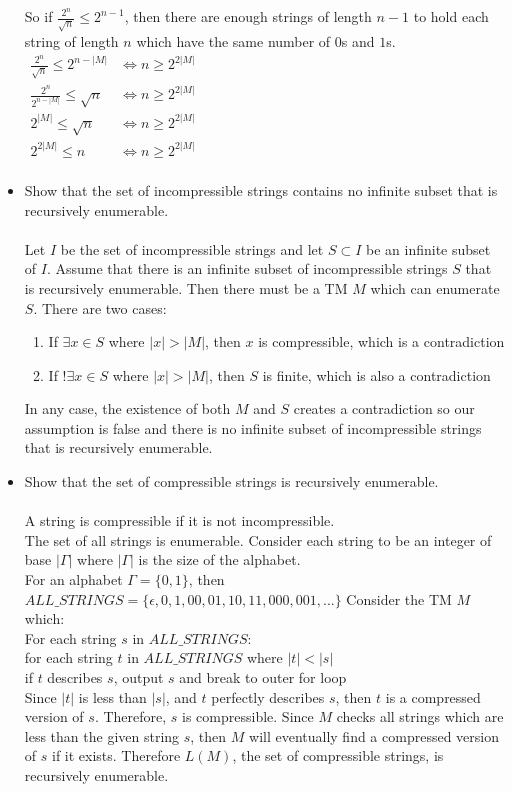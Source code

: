\documentclass[letterpaper,notitlepage,twoside]{article}
\renewcommand{\iff}{\Leftrightarrow} %
\newcommand\tab[1][1cm]{\hspace*{#1}} %
\begin{document}
\begin{itemize}
So if $\frac{2^n}{\sqrt{n}} \leq 2^{n - 1}$, then there are enough strings of length $n - 1$ to hold each string of length $n$ which have the same number of $0$s and $1$s.\\

$\begin{aligned}
\frac{2^n}{\sqrt{n}} \leq 2^{n - |M|} &\iff n \geq 2^{2|M|} \\
\frac{2^n}{2^{n - |M|}} \leq \sqrt{n} &\iff n \geq 2^{2|M|} \\
2^{|M|} \leq \sqrt{n} &\iff n \geq 2^{2|M|} \\
2^{2|M|} \leq n &\iff n \geq 2^{2|M|} \\
\end{aligned}$

\item Show that the set of incompressible strings contains no infinite subset that is recursively enumerable.\\\\
Let $I$ be the set of incompressible strings and let $S \subset I$ be an infinite subset of $I$. Assume that there is an infinite subset of incompressible strings $S$ that is recursively enumerable. Then there must be a TM $M$ which can enumerate $S$. There are two cases:
\begin{enumerate}
\item If $\exists x \in S$ where $|x| > |M|$, then $x$ is compressible, which is a contradiction
\item If $!\exists x \in S$ where $|x| > |M|$, then $S$ is finite, which is also a contradiction
\end{enumerate}
In any case, the existence of both $M$ and $S$ creates a contradiction so our assumption is false and there is no infinite subset of incompressible strings that is recursively enumerable.

\item Show that the set of compressible strings is recursively enumerable.\\\\
A string is compressible if it is not incompressible.\\
The set of all strings is enumerable. Consider each string to be an integer of base $|\Gamma|$ where $|\Gamma|$ is the size of the alphabet. \\
For an alphabet $\Gamma = \{0, 1\}$, then $ALL\_STRINGS = \{\epsilon, 0, 1, 00, 01, 10, 11, 000, 001,...\}$
Consider the TM $M$ which: \\
For each string $s$ in $ALL\_STRINGS$: \\
	\tab for each string $t$ in $ALL\_STRINGS$ where $|t| < |s|$ \\
		\tab\tab if $t$ describes $s$, output $s$ and break to outer for loop \\		
Since $|t|$ is less than $|s|$, and $t$ perfectly describes $s$, then $t$ is a compressed version of $s$. Therefore, $s$ is compressible. Since $M$ checks all strings which are less than the given string $s$, then $M$ will eventually find a compressed version of $s$ if it exists. Therefore $L(M)$, the set of compressible strings, is recursively enumerable.


\end{itemize}
\end{document}
